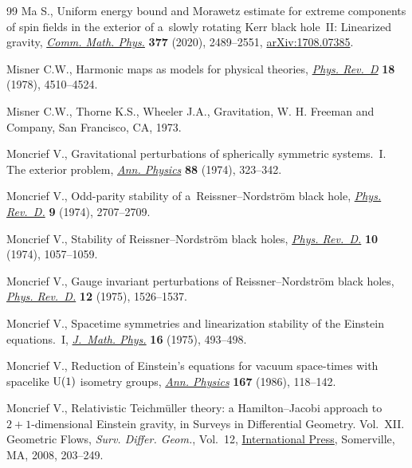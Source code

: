 \documentclass[11pt]{article}
\numberwithin{equation}{section}
\numberwithin{equation}{section}
\begin{document}
\begin{thebibliography}{99}
Ma S., Uniform energy bound and {M}orawetz estimate for extreme components of
 spin fields in the exterior of a~slowly rotating {K}err black hole~{II}:
 {L}inearized gravity,
 \href{https://doi.org/10.1007/s00220-020-03777-2}{\textit{Comm. Math. Phys.}}
 \textbf{377} (2020), 2489--2551,
 \href{http://arxiv.org/abs/1708.07385}{arXiv:1708.07385}.

Misner C.W., Harmonic maps as models for physical theories,
 \href{https://doi.org/10.1103/PhysRevD.18.4510}{\textit{Phys. Rev.~D}}
 \textbf{18} (1978), 4510--4524.

Misner C.W., Thorne K.S., Wheeler J.A., Gravitation, W. H. Freeman and Company,
 San Francisco, CA, 1973.

Moncrief V., Gravitational perturbations of spherically symmetric systems.~{I}.
 {T}he exterior problem,
 \href{https://doi.org/10.1016/0003-4916(74)90173-0}{\textit{Ann. Physics}}
 \textbf{88} (1974), 323--342.

Moncrief V., Odd-parity stability of a~{R}eissner--{N}ordstr\"om black hole,
 \href{https://doi.org/10.1103/PhysRevD.9.2707}{\textit{Phys. Rev.~D.}}
 \textbf{9} (1974), 2707--2709.

Moncrief V., Stability of {R}eissner--{N}ordstr\"om black holes,
 \href{https://doi.org/10.1103/PhysRevD.10.1057}{\textit{Phys. Rev.~D.}}
 \textbf{10} (1974), 1057--1059.

Moncrief V., Gauge invariant perturbations of {R}eissner--{N}ordstr\"om black
 holes, \href{https://doi.org/10.1103/PhysRevD.12.1526}{\textit{Phys.
 Rev.~D.}} \textbf{12} (1975), 1526--1537.

Moncrief V., Spacetime symmetries and linearization stability of the {E}instein
 equations.~{I}, \href{https://doi.org/10.1063/1.522572}{\textit{J.~Math.
 Phys.}} \textbf{16} (1975), 493--498.

Moncrief V., Reduction of {E}instein's equations for vacuum space-times with
 spacelike {${\rm U}(1)$} isometry groups,
 \href{https://doi.org/10.1016/S0003-4916(86)80009-4}{\textit{Ann. Physics}}
 \textbf{167} (1986), 118--142.

Moncrief V., Relativistic {T}eichm\"uller theory: a {H}amilton--{J}acobi
 approach to {$2+1$}-dimensional {E}instein gravity, in Surveys in
 Differential Geometry. {V}ol.~{XII}. {G}eometric Flows, \textit{Surv. Differ.
 Geom.}, Vol.~12,
 \href{https://doi.org/10.4310/SDG.2007.v12.n1.a6}{International Press}, Somerville, MA, 2008, 203--249.


\end{thebibliography}
\end{document}
